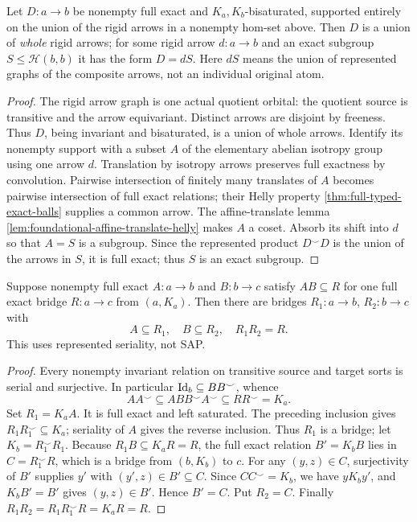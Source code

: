 \begin{lemma}
\label{lem:foundational-rigid-affine}
Let $D:a\to b$ be nonempty full exact and
$K_a,K_b$-bisaturated, supported entirely on the union
of the rigid arrows in a nonempty hom-set above.
Then $D$ is a union of \emph{whole} rigid arrows; for
some rigid arrow $d:a\to b$ and an exact subgroup
$S\le\mathcal H(b,b)$ it has the form $D=dS$.
Here $dS$ means the union of represented graphs of
the composite arrows, not an individual original atom.
\end{lemma}
\begin{proof}
The rigid arrow graph is one actual quotient orbital:
the quotient source is transitive and the arrow equivariant.
Distinct arrows are disjoint by freeness. Thus $D$,
being invariant and bisaturated, is a union of whole arrows.
Identify its nonempty support with a subset $A$ of the
elementary abelian isotropy group using one arrow $d$.
Translation by isotropy arrows preserves full exactness
by convolution. Pairwise intersection of finitely many
translates of $A$ becomes pairwise intersection of full
exact relations; their Helly property
\cref{thm:full-typed-exact-balls} supplies a common arrow.
The affine-translate lemma
\cref{lem:foundational-affine-translate-helly}
makes $A$ a coset. Absorb its shift into $d$ so that
$A=S$ is a subgroup. Since the represented product
$D^\smile D$ is the union of the arrows in $S$,
it is full exact; thus $S$ is an exact subgroup.
\end{proof}

\begin{lemma}
\label{lem:foundational-rigid-factor}
Suppose nonempty full exact $A:a\to b$ and $B:b\to c$
satisfy $AB\subseteq R$ for one full exact bridge
$R:a\to c$ from $(a,K_a)$. Then there are bridges
$R_1:a\to b$, $R_2:b\to c$ with
\[
 A\subseteq R_1,\quad B\subseteq R_2,\quad R_1R_2=R.
\]
This uses represented seriality, not SAP.
\end{lemma}
\begin{proof}
Every nonempty invariant relation on transitive source and
target sorts is serial and surjective. In particular
$\mathrm{Id}_b\subseteq BB^\smile$, whence
\[
 AA^\smile\subseteq ABB^\smile A^\smile
                 \subseteq RR^\smile=K_a.
\]
Set $R_1=K_aA$. It is full exact and left saturated.
The preceding inclusion gives $R_1R_1^\smile\subseteq K_a$;
seriality of $A$ gives the reverse inclusion.
Thus $R_1$ is a bridge; let $K_b=R_1^\smile R_1$.
Because $R_1B\subseteq K_aR=R$, the full exact relation
$B'=K_bB$ lies in $C=R_1^\smile R$, which is a
bridge from $(b,K_b)$ to $c$.
For any $(y,z)\in C$, surjectivity of $B'$ supplies
$y'$ with $(y',z)\in B'\subseteq C$.
Since $CC^\smile=K_b$, we have $yK_by'$,
and $K_bB'=B'$ gives $(y,z)\in B'$.
Hence $B'=C$. Put $R_2=C$.
Finally $R_1R_2=R_1R_1^\smile R=K_aR=R$.
\end{proof}

